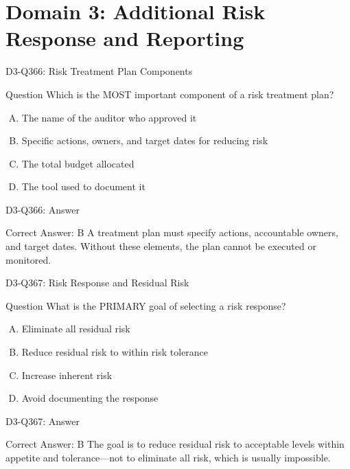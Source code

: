 \documentclass{beamer}
\begin{document}
\section{Domain 3: Additional Risk Response and Reporting}

\begin{frame}{D3-Q366: Risk Treatment Plan Components}
	\begin{block}{Question}
		Which is the MOST important component of a risk treatment plan?
	\end{block}
	\begin{enumerate}[(A)]
		\item The name of the auditor who approved it
		\item Specific actions, owners, and target dates for reducing risk
		\item The total budget allocated
		\item The tool used to document it
	\end{enumerate}
\end{frame}
\begin{frame}{D3-Q366: Answer}
	\begin{block}{Correct Answer: B}
		A treatment plan must specify actions, accountable owners, and target dates. Without these elements, the plan cannot be executed or monitored.
	\end{block}
\end{frame}

\begin{frame}{D3-Q367: Risk Response and Residual Risk}
	\begin{block}{Question}
		What is the PRIMARY goal of selecting a risk response?
	\end{block}
	\begin{enumerate}[(A)]
		\item Eliminate all residual risk
		\item Reduce residual risk to within risk tolerance
		\item Increase inherent risk
		\item Avoid documenting the response
	\end{enumerate}
\end{frame}
\begin{frame}{D3-Q367: Answer}
	\begin{block}{Correct Answer: B}
		The goal is to reduce residual risk to acceptable levels within appetite and tolerance—not to eliminate all risk, which is usually impossible.
	\end{block}
\end{frame}
\end{document}
